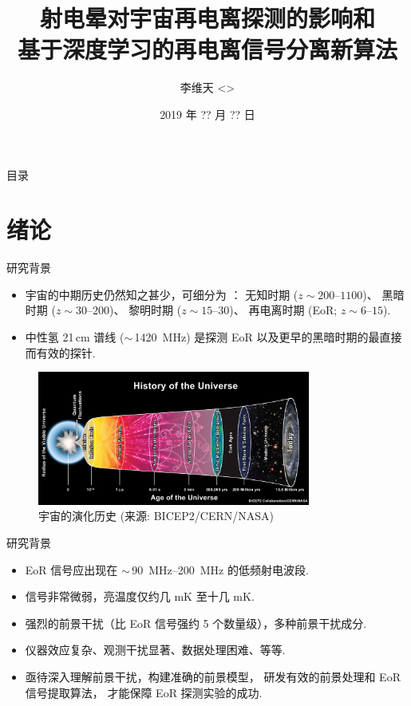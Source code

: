 \documentclass{beamer}
\title[探测宇宙再电离时期]{%
  射电晕对宇宙再电离探测的影响和\texorpdfstring{\\}{}%
  基于深度学习的再电离信号分离新算法%
}
\author[李维天]{李维天 <\email{liweitianux@sjtu.edu.cn}>}
\institute{%
  物理与天文学院\\%
  上海交通大学%
}
\date{\small 2019 年 ?? 月 ?? 日}
\begin{document}
\maketitle

\begin{frame}{目\cspace{}录}
  \tableofcontents[hideallsubsections]
\end{frame}


\section{绪论}

\begin{frame}{研究背景}
  \begin{itemize}
    \item 宇宙的中期历史仍然知之甚少，可细分为 \cite{koopmans2015}：
      无知时期 ($z \sim \numrange{200}{1100}$)、
      黑暗时期 ($z \sim \numrange{30}{200}$)、
      黎明时期 ($z \sim \numrange{15}{30}$)、
      再电离时期 (EoR; $z \sim \numrange{6}{15}$).
    \item 中性氢 21\,cm 谱线 ($\sim$\,\SI{1420}{\MHz})
      是探测 EoR 以及更早的黑暗时期的最直接而有效的探针.
  \end{itemize}

  \begin{figure}
    \centering
    \includegraphics[width=0.8\textwidth]{universe-history}
    \caption{宇宙的演化历史 (来源: BICEP2/CERN/NASA)}
  \end{figure}
\end{frame}

\begin{frame}{研究背景}
  \begin{itemize}
    \item EoR 信号应出现在 $\sim$\,\SIrange{90}{200}{\MHz} 的低频射电波段.
    \item 信号非常微弱，亮温度仅约几 mK 至十几 mK.
    \item 强烈的前景干扰（比 EoR 信号强约 5 个数量级），多种前景干扰成分.
    \item 仪器效应复杂、观测干扰显著、数据处理困难、等等.
    \item 亟待深入理解前景干扰，构建准确的前景模型，
      研发有效的前景处理和 EoR 信号提取算法，
      才能保障 EoR 探测实验的成功.
  \end{itemize}
\end{frame}
\end{document}
